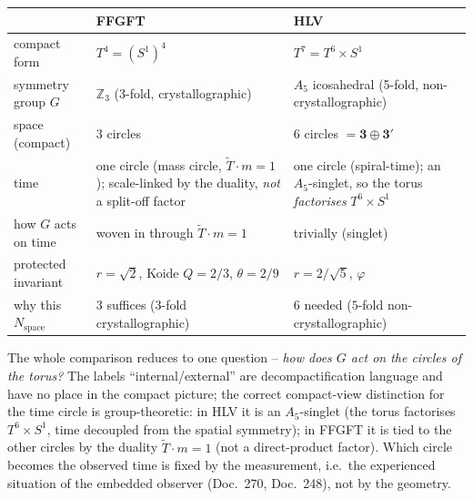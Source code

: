 \begin{center}\small
\renewcommand{\arraystretch}{1.3}
\begin{tabular}{@{}p{3.5cm} p{4.4cm} p{4.7cm}@{}}
\toprule
 & \textbf{FFGFT} & \textbf{HLV} \\
\midrule
compact form & $T^4=(S^1)^4$ & $T^7=T^6\times S^1$ \\
symmetry group $G$ & $\mathbb{Z}_3$ (3-fold, crystallographic) & $A_5$ icosahedral (5-fold, non-crystallographic) \\
space (compact) & $3$ circles & $6$ circles $=\mathbf{3}\oplus\mathbf{3'}$ \\
time & one circle (mass circle, $\tilde{T}\cdot m=1$); scale-linked by the duality, \emph{not} a split-off factor & one circle (spiral-time); an $A_5$-singlet, so the torus \emph{factorises} $T^6\times S^1$ \\
how $G$ acts on time & woven in through $\tilde{T}\cdot m=1$ & trivially (singlet) \\
protected invariant & $r=\sqrt2$, Koide $Q=2/3$, $\theta=2/9$ & $r=2/\sqrt5$, $\varphi$ \\
why this $N_\text{space}$ & $3$ suffices ($3$-fold crystallographic) & $6$ needed ($5$-fold non-crystallographic) \\
\bottomrule
\end{tabular}
\end{center}

The whole comparison reduces to one question -- \emph{how does $G$ act on the circles of
the torus?} The labels ``internal/external'' are decompactification language and have no
place in the compact picture; the correct compact-view distinction for the time circle is
group-theoretic: in HLV it is an $A_5$-singlet (the torus factorises $T^6\times S^1$,
time decoupled from the spatial symmetry); in FFGFT it is tied to the other circles by the
duality $\tilde{T}\cdot m=1$ (not a direct-product factor). Which circle becomes the
observed time is fixed by the measurement, i.e.\ the experienced situation of the embedded
observer (Doc.~270, Doc.~248), not by the geometry.

